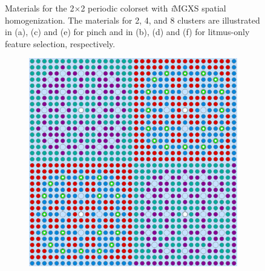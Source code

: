 \begin{figure}[h!]
\begin{subfigure}{0.47\textwidth}
  \caption{}
  \label{fig:chap10-assm-2x2-combined-8}
\end{subfigure}
\caption[Materials for the 2$\times$2 periodic colorset with \textit{i}\ac{MGXS} homogenization]{Materials for the 2$\times$2 periodic colorset with \textit{i}\ac{MGXS} spatial homogenization. The materials for 2, 4, and 8 clusters are illustrated in (a), (c) and (e) for pinch and in (b), (d) and (f) for litmus-only feature selection, respectively.}
\label{fig:chap10-2x2-geometries}
\end{figure}

\clearpage

\begin{figure}[h!]
\centering
\begin{subfigure}{0.47\textwidth}
  \centering
  \includegraphics[width=0.9\linewidth]{figures/unsupervised/geometries/with-features/2-clusters/pinch/reflector}
  \caption{}
  \label{fig:chap10-reflector-pinch-2}
\end{subfigure}%
\begin{subfigure}{0.47\textwidth}
  \centering

\end{subfigure}
\end{figure}
